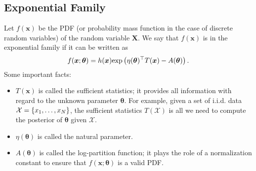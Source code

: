     \subsection{Exponential Family}
        Let $f(\bm{x})$ be the PDF (or probability mass function in the case of discrete random variables) of the random variable $\bm{X}$.
        We say that $f(\bm{x})$ is in the exponential family if it can be written as
            \begin{equation}
                f(\bm{x}; \bm{\theta}) = h(\bm{x})   \text{exp}\left( \eta(\bm{\theta})^\top T(\bm{x}) - A(\bm{\theta}) \right) .
            \end{equation}
        Some important facts:
            \begin{itemize}
                \item $T(\bm{x})$ is called the sufficient statistics; it provides all information with regard to the unknown parameter $\bm{\theta}$. 
                For example, given a set of i.i.d. data $\mathcal{X}=\{ x_1, \ldots, x_N \}$, the sufficient statistics $T(\mathcal{X})$ is all we need to compute the posterior of $\bm{\theta}$ given $\mathcal{X}$.
                \item $\eta(\bm{\theta})$ is called the natural parameter.
                \item $A(\bm{\theta})$ is called the log-partition function; it plays the role of a normalization constant to ensure that $f(\bm{x}; \bm{\theta})$ is a valid PDF.
            \end{itemize}
        
    